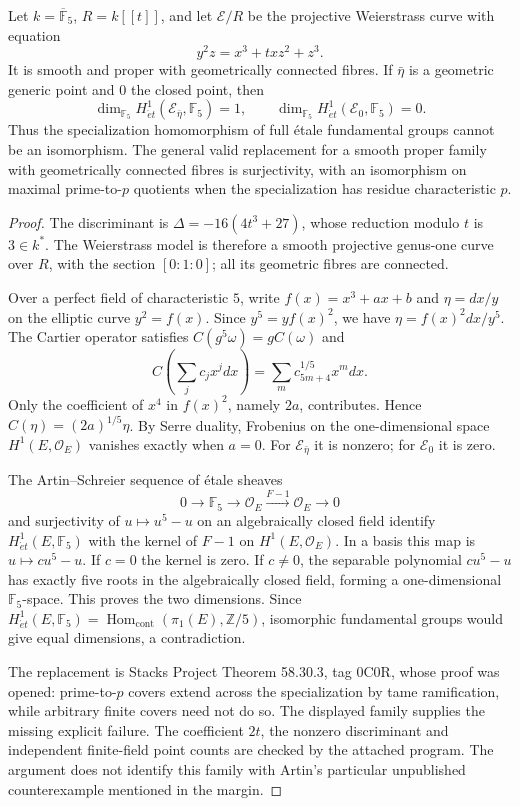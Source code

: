 \begin{proposition}\label{B:specialization}
Let $k=\overline{\mathbb F}_5$, $R=k[[t]]$, and let $\mathcal E/R$ be the projective Weierstrass curve with equation
\[
 y^2z=x^3+t xz^2+z^3.
\]
It is smooth and proper with geometrically connected fibres. If $\bar\eta$ is a geometric generic point and $0$ the closed point, then
\[
 \dim_{\mathbb F_5}H^1_{\acute et}(\mathcal E_{\bar\eta},\mathbb F_5)=1,
 \qquad
 \dim_{\mathbb F_5}H^1_{\acute et}(\mathcal E_0,\mathbb F_5)=0.
\]
Thus the specialization homomorphism of full \'etale fundamental groups cannot be an isomorphism. The general valid replacement for a smooth proper family with geometrically connected fibres is surjectivity, with an isomorphism on maximal prime-to-$p$ quotients when the specialization has residue characteristic $p$.
\end{proposition}
\begin{proof}
The discriminant is $\Delta=-16(4t^3+27)$, whose reduction modulo $t$ is $3\in k^*$. The Weierstrass model is therefore a smooth projective genus-one curve over $R$, with the section $[0:1:0]$; all its geometric fibres are connected.

Over a perfect field of characteristic $5$, write $f(x)=x^3+a x+b$ and $\eta=dx/y$ on the elliptic curve $y^2=f(x)$. Since $y^5=y f(x)^2$, we have $\eta=f(x)^2dx/y^5$. The Cartier operator satisfies $C(g^5\omega)=gC(\omega)$ and
\[
 C\left(\sum_j c_jx^jdx\right)
   =\sum_m c_{5m+4}^{1/5}x^m dx.
\]
Only the coefficient of $x^4$ in $f(x)^2$, namely $2a$, contributes. Hence $C(\eta)=(2a)^{1/5}\eta$. By Serre duality, Frobenius on the one-dimensional space $H^1(E,\mathcal O_E)$ vanishes exactly when $a=0$. For $\mathcal E_{\bar\eta}$ it is nonzero; for $\mathcal E_0$ it is zero.

The Artin--Schreier sequence of \'etale sheaves
\[
 0\longrightarrow\mathbb F_5\longrightarrow\mathcal O_E
   \xrightarrow{F-1}\mathcal O_E\longrightarrow0
\]
and surjectivity of $u\mapsto u^5-u$ on an algebraically closed field identify $H^1_{\acute et}(E,\mathbb F_5)$ with the kernel of $F-1$ on $H^1(E,\mathcal O_E)$. In a basis this map is $u\mapsto cu^5-u$. If $c=0$ the kernel is zero. If $c\ne0$, the separable polynomial $cu^5-u$ has exactly five roots in the algebraically closed field, forming a one-dimensional $\mathbb F_5$-space. This proves the two dimensions. Since $H^1_{\acute et}(E,\mathbb F_5)=\operatorname{Hom}_{\mathrm{cont}}(\pi_1(E),\mathbb Z/5)$, isomorphic fundamental groups would give equal dimensions, a contradiction.

The replacement is Stacks Project Theorem 58.30.3, tag 0C0R, whose proof was opened: prime-to-$p$ covers extend across the specialization by tame ramification, while arbitrary finite covers need not do so. The displayed family supplies the missing explicit failure. The coefficient $2t$, the nonzero discriminant and independent finite-field point counts are checked by the attached program. The argument does not identify this family with Artin's particular unpublished counterexample mentioned in the margin.
\end{proof}

